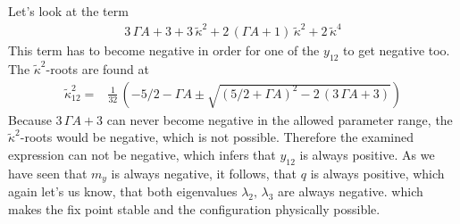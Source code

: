 \documentclass{article}
\begin{document}
Let's look at the term 
\begin{align*}
    3\,\Gamma A +3 +3\,\tilde{\kappa}^2+2\,(\Gamma A+1)\,\tilde{\kappa}^2+2\,\tilde{\kappa}^4
\end{align*}
This term has to become negative in order for one of the $y_{12}$ to get negative too. The $\tilde{\kappa}^2$-roots are found at
\begin{align*}
    \tilde{\kappa}^2_{12}=&\frac{1}{32}\,(-5/2-\Gamma A\pm\sqrt{(5/2+\Gamma A)^2-2\,(3\,\Gamma A+3)})
\end{align*}
Because $3\,\Gamma A+3$ can never become negative in the allowed parameter range, the $\tilde{\kappa}^2$-roots would be negative, which is not possible. Therefore the examined expression can not be negative, which infers that $y_{12}$ is always positive. As we have seen that $m_y$ is always negative, it follows, that $q$ is always positive, which again let's us know, that both eigenvalues $\lambda_{2},\,\lambda_3$ are always negative. which makes the fix point stable and the configuration physically possible.\\\\
\end{document}
